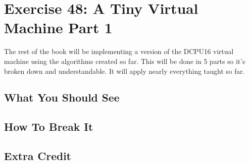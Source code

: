 \chapter{Exercise 48: A Tiny Virtual Machine Part 1}

The rest of the book will be implementing a version of the DCPU16 virtual
machine using the algorithms created so far.  This will be done in 
5 parts so it's broken down and understandable.  It will apply nearly
everything taught so far.


\section{What You Should See}


\section{How To Break It}


\section{Extra Credit}



